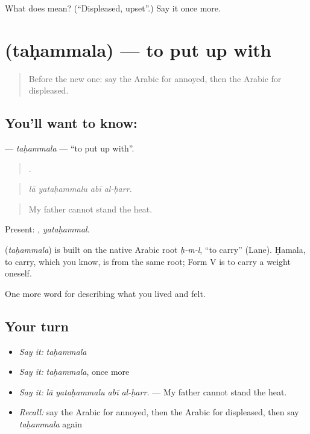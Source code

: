 \begin{tcolorbox}[breakable,colback=teal!4,colframe=teal!35!black,title={Before you move on}]
What does  mean? (\textquotedblleft{}Displeased, upset\textquotedblright{}.) Say it once more.
\end{tcolorbox}
\section[\texorpdfstring{\ar{تحمل} (taḥammala)}{تحمل (taḥammala)}]{ (taḥammala) — to put up with}

\label{lesson:AR-C495-tahammala}



\begin{quote}
Before the new one: say the Arabic for annoyed, then the Arabic for displeased.
\end{quote}

\subsection*{You'll want to know: }
\textbf{} — \emph{taḥammala} — \textquotedblleft{}to put up with\textquotedblright{}.

\begin{quote}
   .
\end{quote}

\begin{quote}
\emph{lā yataḥammalu abī al-ḥarr.}
\end{quote}

\begin{quote}
My father cannot stand the heat.
\end{quote}

Present: , \emph{yataḥammal}.

\begin{cousinweb}
\textbf{} (\emph{taḥammala}) is built on the native Arabic root \emph{ḥ-m-l}, \textquotedblleft{}to carry\textquotedblright{} (Lane). Ḥamala, to carry, which you know, is from the same root; Form V is to carry a weight oneself.
\end{cousinweb}

\begin{grammarlens}[title={What you've built}]
One more word for describing what you lived and felt.
\end{grammarlens}

\subsection*{Your turn}
\begin{itemize}
\raggedright
  \item \emph{Say it:} \emph{taḥammala}
  \item \emph{Say it:} \emph{taḥammala}, once more
  \item \emph{Say it:} \emph{lā yataḥammalu abī al-ḥarr.} — My father cannot stand the heat.
  \item \emph{Recall:} say the Arabic for annoyed, then the Arabic for displeased, then say \emph{taḥammala} again
\end{itemize}

